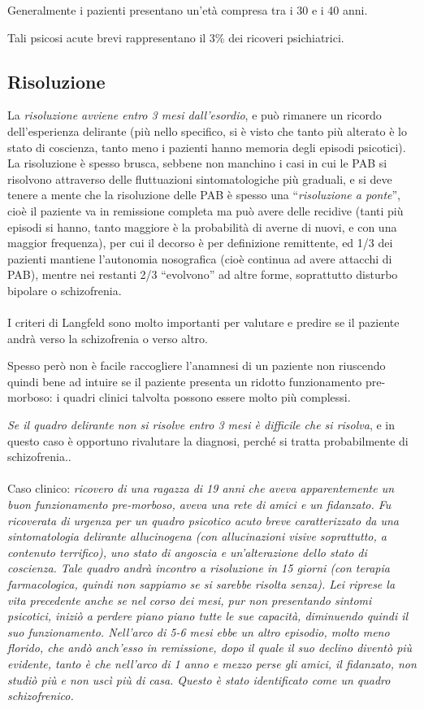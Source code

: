 Generalmente i pazienti presentano un'età compresa tra i 30 e i 40 anni.

Tali psicosi acute brevi rappresentano il 3\% dei ricoveri psichiatrici.

\subsection{Risoluzione}

La \emph{risoluzione avviene entro 3 mesi dall'esordio}, e può rimanere
un ricordo dell'esperienza delirante (più nello specifico, si è visto
che tanto più alterato è lo stato di coscienza, tanto meno i pazienti
hanno memoria degli episodi psicotici). La risoluzione è spesso brusca,
sebbene non manchino i casi in cui le PAB si risolvono attraverso delle
fluttuazioni sintomatologiche più graduali, e si deve tenere a mente che
la risoluzione delle PAB è spesso una ``\emph{risoluzione a ponte}'',
cioè il paziente va in remissione completa ma può avere delle recidive
(tanti più episodi si hanno, tanto maggiore è la probabilità di averne
di nuovi, e con una maggior frequenza), per cui il decorso è per
definizione remittente, ed 1/3 dei pazienti mantiene l'autonomia
nosografica (cioè continua ad avere attacchi di PAB), mentre nei
restanti 2/3 ``evolvono'' ad altre forme, soprattutto disturbo bipolare
o schizofrenia.
\\\\
I criteri di Langfeld sono molto importanti per valutare e predire se il
paziente andrà verso la schizofrenia o verso altro.

Spesso però non è facile raccogliere l'anamnesi di un paziente non
riuscendo quindi bene ad intuire se il paziente presenta un ridotto
funzionamento pre-morboso: i quadri clinici talvolta possono essere
molto più complessi.

\emph{Se il quadro delirante non si risolve entro 3 mesi è difficile che
si risolva}, e in questo caso è opportuno rivalutare la diagnosi, perché
si tratta probabilmente di schizofrenia..
\\\\
Caso clinico: \emph{ricovero di una ragazza di 19 anni che aveva
apparentemente un buon funzionamento pre-morboso, aveva una rete di
amici e un fidanzato. Fu ricoverata di urgenza per un quadro psicotico
acuto breve caratterizzato da una sintomatologia delirante allucinogena
(con allucinazioni visive soprattutto, a contenuto terrifico), uno stato
di angoscia e un'alterazione dello stato di coscienza. Tale quadro andrà
incontro a risoluzione in 15 giorni (con terapia farmacologica, quindi
non sappiamo se si sarebbe risolta senza). Lei riprese la vita
precedente anche se nel corso dei mesi, pur non presentando sintomi
psicotici, iniziò a perdere piano piano tutte le sue capacità,
diminuendo quindi il suo funzionamento. Nell'arco di 5-6 mesi ebbe un
altro episodio, molto meno florido, che andò anch'esso in remissione,
dopo il quale il suo declino diventò più evidente, tanto è che nell'arco
di 1 anno e mezzo perse gli amici, il fidanzato, non studiò più e non
uscì più di casa. Questo è stato identificato come un quadro
schizofrenico.}

